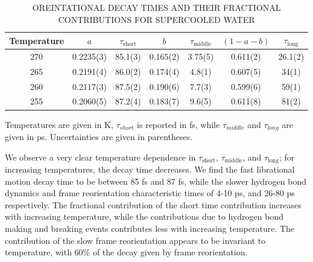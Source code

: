 \begin{table}[h] \centering \caption{OREINTATIONAL DECAY TIMES AND
    THEIR FRACTIONAL CONTRIBUTIONS FOR SUPERCOOLED WATER\label{tab:supOrient}}
\begin{threeparttable}
\begin{tabular}{ccccccc}
\hline
\hline
 Temperature & $a$ & $\tau_\mathrm{short}$& $b$ &
                                                  $\tau_\mathrm{middle}$
  & $(1-a-b)$ & $\tau_\mathrm{long}$\\
\hline
270 &0.2235(3) &85.1(3) & 0.165(2) & 3.75(5) & 0.611(2) & 26.1(2)\\
265 &0.2191(4) &86.0(2) & 0.174(4) & 4.8(1) & 0.607(5) & 34(1)\\
260 &0.2117(3) &87.5(2) & 0.190(6) & 7.7(3) & 0.599(6) & 59(1)\\
255 &0.2060(5) &87.2(4) & 0.183(7) & 9.6(5) & 0.611(8) & 81(2)\\
\hline
\hline
\end{tabular}
\begin{tablenotes}
      \small
    \item Temperatures are given in K, $\tau_{short}$ is reported in
      fs, while $\tau_{middle}$ and $\tau_{long}$ are given in
      ps. Uncertainties are given in parentheses.
\end{tablenotes}
\end{threeparttable}
\end{table}

We observe a very clear temperature dependence in
$\tau_\mathrm{short}$, $\tau_\mathrm{middle}$, and
$\tau_\mathrm{long}$; for increasing temperatures, the decay time
decreases. We find the fast librational motion decay time to be
between 85 fs and 87 fs, while the slower hydrogen bond dynamics and
frame reorientation characteristic times of 4-10 ps, and 26-80 ps
respectively.  The fractional contribution of the short time
contribution increases with increasing temperature, while the
contributions due to hydrogen bond making and breaking events
contributes less with increasing temperature. The contribution of the slow frame
reorientation appears to be invariant to temperature, with 60$\%$
of the decay given by frame reorientation.


